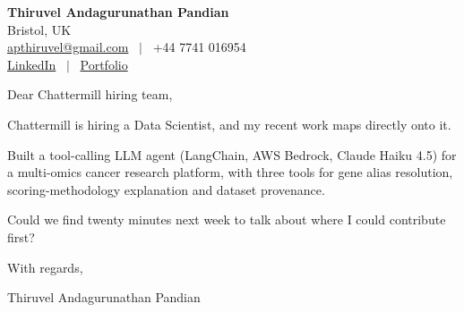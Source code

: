\documentclass[11pt,a4paper]{article}
\begin{document}
\raggedright
\pagestyle{empty}

\begin{center}
    {\LARGE \color{linkblue} \textbf{Thiruvel Andagurunathan Pandian}}\\[0.2cm]
    Bristol, UK \\
    \href{mailto:apthiruvel@gmail.com}{apthiruvel@gmail.com} \ $|$ \ +44 7741 016954 \\
\href{https://www.linkedin.com/in/thiruvel-a-p/}{LinkedIn} \ $|$ \ \href{https://thiruvel-ap.github.io/PersonalPortfolio/}{Portfolio}
\end{center}

\vspace{0.4cm}

\noindent
Dear Chattermill hiring team,

Chattermill is hiring a Data Scientist, and my recent work maps directly onto it.

Built a tool-calling LLM agent (LangChain, AWS Bedrock, Claude Haiku 4.5) for a multi-omics cancer research platform, with three tools for gene alias resolution, scoring-methodology explanation and dataset provenance.

Could we find twenty minutes next week to talk about where I could contribute first?

\vspace{0.5cm}

With regards,

Thiruvel Andagurunathan Pandian
\end{document}
